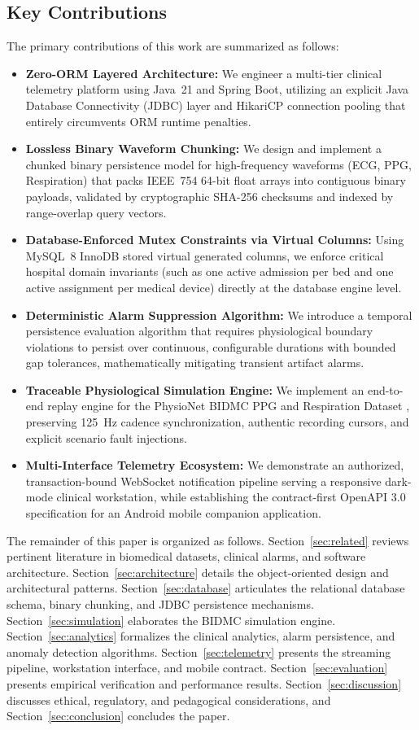 \documentclass[10pt,journal,compsoc]{IEEEtran}
\begin{document}
\subsection{Key Contributions}
The primary contributions of this work are summarized as follows:
\begin{itemize}
    \item \textbf{Zero-ORM Layered Architecture:} We engineer a multi-tier clinical telemetry platform using Java~21 and Spring Boot, utilizing an explicit Java Database Connectivity (JDBC) layer and HikariCP connection pooling that entirely circumvents ORM runtime penalties.
    \item \textbf{Lossless Binary Waveform Chunking:} We design and implement a chunked binary persistence model for high-frequency waveforms (ECG, PPG, Respiration) that packs IEEE~754 64-bit float arrays into contiguous binary payloads, validated by cryptographic SHA-256 checksums and indexed by range-overlap query vectors.
    \item \textbf{Database-Enforced Mutex Constraints via Virtual Columns:} Using MySQL~8 InnoDB stored virtual generated columns, we enforce critical hospital domain invariants (such as one active admission per bed and one active assignment per medical device) directly at the database engine level.
    \item \textbf{Deterministic Alarm Suppression Algorithm:} We introduce a temporal persistence evaluation algorithm that requires physiological boundary violations to persist over continuous, configurable durations with bounded gap tolerances, mathematically mitigating transient artifact alarms.
    \item \textbf{Traceable Physiological Simulation Engine:} We implement an end-to-end replay engine for the PhysioNet BIDMC PPG and Respiration Dataset \cite{pimentel2016robust}, preserving 125~Hz cadence synchronization, authentic recording cursors, and explicit scenario fault injections.
    \item \textbf{Multi-Interface Telemetry Ecosystem:} We demonstrate an authorized, transaction-bound WebSocket notification pipeline serving a responsive dark-mode clinical workstation, while establishing the contract-first OpenAPI 3.0 specification for an Android mobile companion application.
\end{itemize}

The remainder of this paper is organized as follows. Section~\ref{sec:related} reviews pertinent literature in biomedical datasets, clinical alarms, and software architecture. Section~\ref{sec:architecture} details the object-oriented design and architectural patterns. Section~\ref{sec:database} articulates the relational database schema, binary chunking, and JDBC persistence mechanisms. Section~\ref{sec:simulation} elaborates the BIDMC simulation engine. Section~\ref{sec:analytics} formalizes the clinical analytics, alarm persistence, and anomaly detection algorithms. Section~\ref{sec:telemetry} presents the streaming pipeline, workstation interface, and mobile contract. Section~\ref{sec:evaluation} presents empirical verification and performance results. Section~\ref{sec:discussion} discusses ethical, regulatory, and pedagogical considerations, and Section~\ref{sec:conclusion} concludes the paper.
\end{document}
